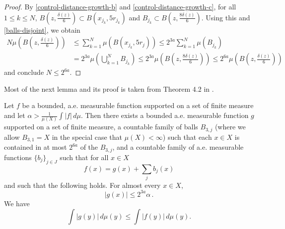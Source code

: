 \begin{proof}
By \eqref{control-distance-growth-b} and \eqref{control-distance-growth-c}, for all $1\le k \le N$, $B(z,\frac{\delta(z)}{6}) \subset B(x_{j_k}, 5r_{j_k})$ and $B_{j_k} \subset B(z,\frac{8\delta(z)}{6})$. Using this and \eqref{balls-disjoint}, we obtain
\begin{align}
    N \mu(B(z,\frac{\delta(z)}{6})) &\le \sum_{k=1}^N \mu(B(x_{j_k}, 5r_j)) \le 2^{3a} \sum_{k=1}^N \mu(B_{j_k}) \\
    &= 2^{3a} \mu(\bigcup_{k=1}^N B_{j_k}) \le 2^{3a} \mu(B(z,\frac{8\delta(z)}{6})) \le 2^{6a} \mu(B(z,\frac{\delta(z)}{6}))
\end{align}
and conclude $N\le 2^{6a}$.
\end{proof}

Most of the next lemma and its proof is taken from Theorem 4.2 in \cite{stein-book}.
\begin{lemma}
    \label{Calderon-Zygmund-decomposition}
    \leanok
    Let $f$ be a bounded, a.e. measurable function supported on a set of finite measure and let $\alpha>\frac{1}{\mu(X)}\int |f|\,d\mu$.
    Then there exists a bounded a.e. measurable function $g$ supported on a set of finite measure, a countable family of balls $B_{3,j}$ (where we allow $B_{3,1} = X$ in the special case that $\mu(X)<\infty$)
    such that each $x\in X$ is contained in at most $2^{6a}$ of the $B_{3,j}$, and a countable family of a.e. measurable functions $\{b_j\}_{j\in J}$ such that for all $x \in X$
    \begin{equation}
       \label{eq-gb-dec}
       f(x)= g(x) + \sum_{j} b_j(x)
    \end{equation}
    and such that the following holds. For almost every $x\in X$,
    \begin{equation}
        \label{eq-g-max}
       |g(x)|\leq 2^{3a} \alpha\,.
    \end{equation}
    We have
    \begin{equation}
        \label{eq-g-L1-norm}
        \int |g(y)|\, d\mu(y)\leq \int |f(y)|\, d\mu(y).

\end{equation}
\end{lemma}
